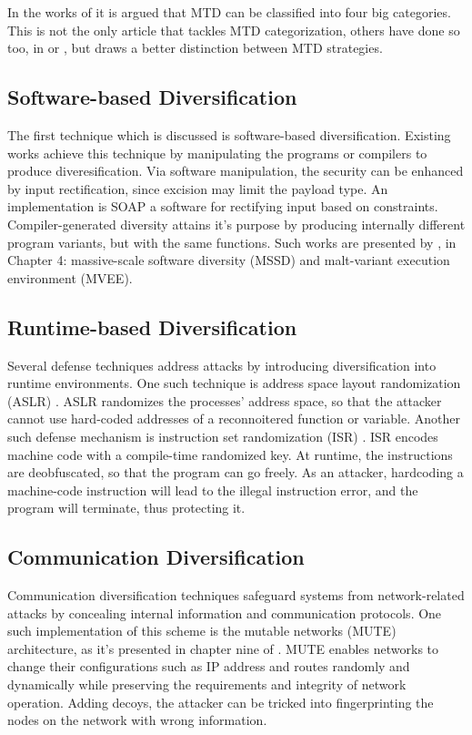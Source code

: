 In the works of \cite{mtd_techniques} it is argued that MTD can be classified into four big categories. This is not the only article that tackles MTD categorization, others have done so too, in \cite{mtd_review_of_defense_mechanisms} or \cite{mtd_other_classification_methods}, but \cite{mtd_techniques} draws a better distinction between MTD strategies.

\subsection{Software-based Diversification}
The first technique which is discussed is software-based diversification. Existing works achieve this technique by manipulating the programs or compilers to produce diveresification. Via software manipulation, the security can be enhanced by input rectification, since excision may limit the payload type. An implementation is SOAP \cite{soap_software_mtd_technique} a software for rectifying input based on constraints.\\ 
Compiler-generated diversity attains it's purpose by producing internally different program variants, but with the same functions. Such works are presented by \cite{mtd_vol1}, in Chapter 4: massive-scale software diversity (MSSD) and malt-variant execution environment (MVEE).

\subsection{Runtime-based Diversification}
Several defense techniques address attacks by introducing diversification into runtime environments. One such technique is address space layout randomization (ASLR) \cite{aslr_runtime_mtd_technique}. ASLR randomizes the processes' address space, so that the attacker cannot use hard-coded addresses of a reconnoitered function or variable. Another such defense mechanism is instruction set randomization (ISR) \cite{isr_runtime_mtd_technique}. ISR encodes machine code with a compile-time randomized key. At runtime, the instructions are deobfuscated, so that the program can go freely. As an attacker, hardcoding a machine-code instruction will lead  to the illegal instruction error, and the program will terminate, thus protecting it. 

\subsection{Communication Diversification}
Communication diversification techniques safeguard systems from network-related attacks by concealing internal information and communication protocols. One such implementation of this scheme is the mutable networks  (MUTE) architecture, as it's presented in chapter nine of \cite{mtd_vol1}. MUTE enables networks to change their configurations such as IP address and routes randomly and dynamically while preserving the requirements and integrity of network operation. Adding decoys, the attacker can be tricked into fingerprinting the nodes on the network with wrong information.

